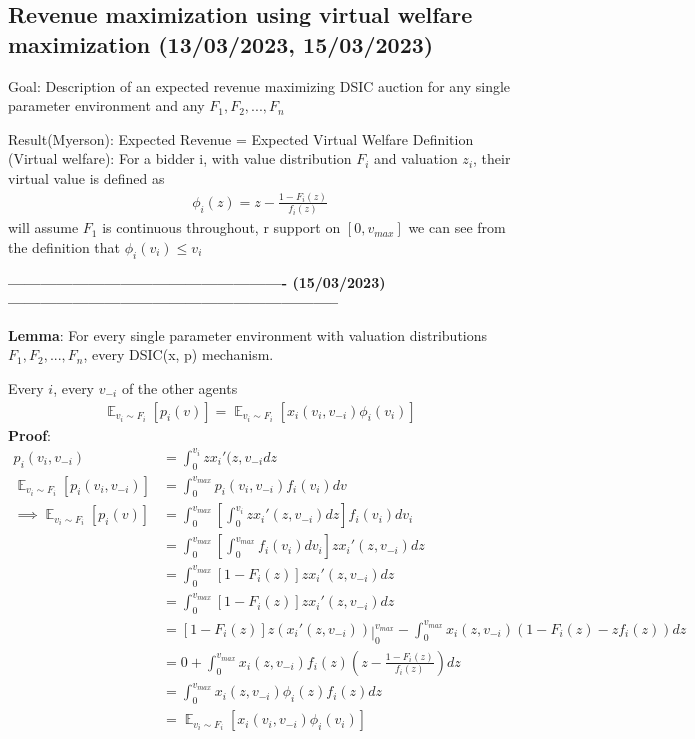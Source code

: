 \documentclass[11pt]{article}
\begin{document}
\subsection{Revenue maximization using virtual welfare maximization (13/03/2023, 15/03/2023)}
\label{sec:orgca81fca}
Goal: Description of an expected revenue maximizing DSIC auction for any single parameter environment and any \(F_1, F_2, ..., F_n\)

Result(Myerson): Expected Revenue = Expected Virtual Welfare
Definition (Virtual welfare): For a bidder i, with value distribution \(F_i\) and valuation \(z_i\), their virtual value is defined as
\begin{align*}
\phi_i(z) = z - \frac{1 - F_i(z)}{f_i(z)}
\end{align*}
will assume \(F_1\) is continuous throughout, r support on \([0, v_{max}]\)
we can see from the definition that \(\phi_i(v_i) \leq v_i\)

\textbf{---------------------------------------------------- (15/03/2023)--------------------------------------------------------------}

\textbf{Lemma}: For every single parameter environment with valuation distributions \(F_1, F_2, ..., F_n\), every DSIC(x, p) mechanism.

Every \(i\), every \(v_{-i}\) of the other agents
\begin{align*}
\mathop{\mathbb{E}}_{v_i \sim F_i} [p_i(v)] = \mathop{\mathbb{E}}_{v_i \sim F_i} [x_i(v_i, v_{-i}) \phi_i(v_i)]
\end{align*}
\textbf{Proof}:
\begin{align*}
p_i(v_i, v_{-i}) &= \int_0^{v_i} z x_i'(z, v_{-i} dz \\
\mathop{\mathbb{E}}_{v_i \sim F_i} [p_i(v_i, v_{-i})] &= \int_0^{v_{max}} p_i (v_i, v_{-i}) f_i(v_i) dv \\
\implies \mathop{\mathbb{E}}_{v_i \sim F_i} [p_i(v)] &= \int_0^{v_{max}} \left[ \int_0^{v_i} z x_i'(z, v_{-i})dz \right] f_i(v_i) dv_i \\
&= \int_0^{v_{max}} \left[ \int_0^{v_{max}} f_i(v_i) dv_i \right] z x_i'(z, v_{-i})dz \\
&= \int_0^{v_{max}} \left[ 1 - F_i(z) \right] z x_i'(z, v_{-i})dz \\
&= \int_0^{v_{max}} \left[ 1 - F_i(z) \right] z x_i'(z, v_{-i})dz \\
&= \left[ 1 - F_i(z) \right]z \left( x_i'(z, v_{-i}) \right)\mathop{|}_0^{v_{max}} - \int_0^{v_{max}} x_i(z, v_{-i})(1 - F_i(z)  -zf_i(z))dz \\
&= 0 + \int_0^{v_{max}} x_i(z, v_{-i}) f_i(z) \left( z - \frac{1-F_i(z)}{f_i(z)} \right)dz \\
&= \int_0^{v_{max}} x_i(z, v_{-i}) \phi_i(z) f_i(z) dz \\
&= \mathop{\mathbb{E}}_{v_i \sim F_i} \left[ x_i(v_i, v_{-i}) \phi_i(v_i) \right]
\end{align*}
\end{document}
